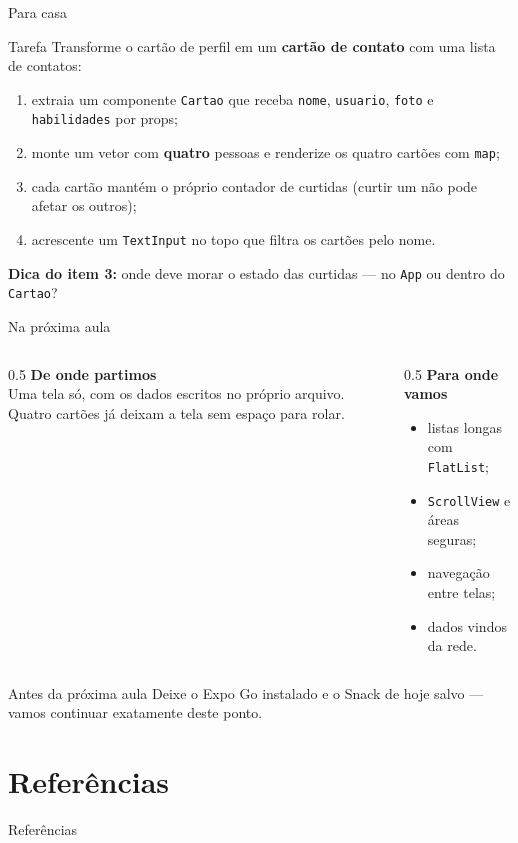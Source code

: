 \documentclass[aspectratio=169]{beamer}
\begin{document}
\begin{frame}{Para casa}
  \begin{block}{Tarefa}
    Transforme o cartão de perfil em um \textbf{cartão de contato} com uma
    lista de contatos:
    \begin{enumerate}
      \item extraia um componente \texttt{Cartao} que receba
        \texttt{nome}, \texttt{usuario}, \texttt{foto} e \texttt{habilidades} por props;
      \item monte um vetor com \textbf{quatro} pessoas e renderize os quatro
        cartões com \texttt{map};
      \item cada cartão mantém o próprio contador de curtidas
        (curtir um não pode afetar os outros);
      \item acrescente um \texttt{TextInput} no topo que filtra os cartões pelo nome.
    \end{enumerate}
  \end{block}
  \textbf{Dica do item 3:} onde deve morar o estado das curtidas ---
  no \texttt{App} ou dentro do \texttt{Cartao}?
\end{frame}

\begin{frame}{Na próxima aula}
  \begin{columns}[T]
    \begin{column}{0.5\textwidth}
      \textbf{De onde partimos}\\[0.3em]
      Uma tela só, com os dados escritos no próprio arquivo. Quatro cartões
      já deixam a tela sem espaço para rolar.
    \end{column}
    \begin{column}{0.5\textwidth}
      \textbf{Para onde vamos}\\[0.3em]
      \begin{itemize}
        \item listas longas com \texttt{FlatList};
        \item \texttt{ScrollView} e áreas seguras;
        \item navegação entre telas;
        \item dados vindos da rede.
      \end{itemize}
    \end{column}
  \end{columns}
  \begin{block}{Antes da próxima aula}
    Deixe o Expo Go instalado e o Snack de hoje salvo --- vamos continuar
    exatamente deste ponto.
  \end{block}
\end{frame}

\section*{Referências}
\begin{frame}[allowframebreaks]{Referências}
  \nocite{*}
  
  
\end{frame}
\end{document}
